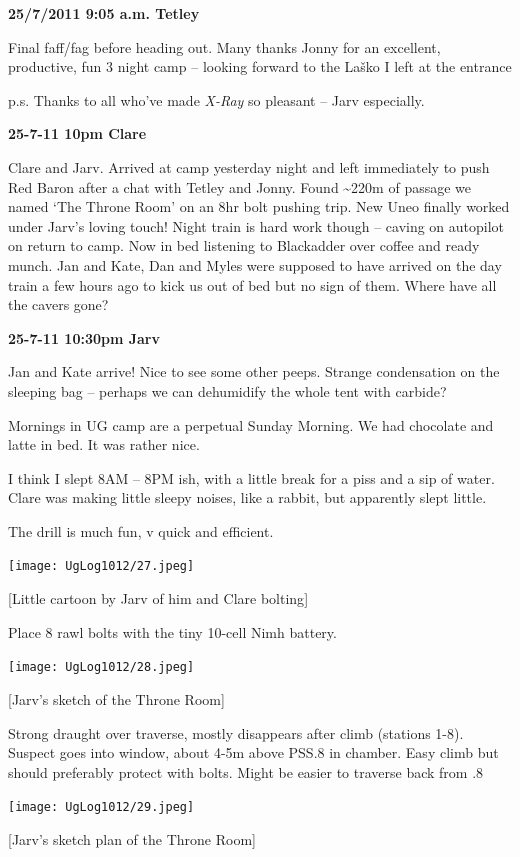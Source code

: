 \textbf{25/7/2011 9:05 a.m. Tetley}

Final faff/fag before heading out. Many thanks Jonny for an excellent,
productive, fun 3 night camp -- looking forward to the Laško I left at
the entrance

p.s. Thanks to all who've made \emph{X-Ray} so pleasant -- Jarv
especially.

\textbf{25-7-11 10pm Clare}

Clare and Jarv. Arrived at camp yesterday night and left immediately to
push Red Baron after a chat with Tetley and Jonny. Found
\textasciitilde{}220m of passage we named `The Throne Room' on an 8hr
bolt pushing trip. New Uneo finally worked under Jarv's loving touch!
Night train is hard work though -- caving on autopilot on return to
camp. Now in bed listening to Blackadder over coffee and ready munch.
Jan and Kate, Dan and Myles were supposed to have arrived on the day
train a few hours ago to kick us out of bed but no sign of them. Where
have all the cavers gone?

\textbf{25-7-11 10:30pm Jarv}

Jan and Kate arrive! Nice to see some other peeps. Strange condensation
on the sleeping bag -- perhaps we can dehumidify the whole tent with
carbide?

Mornings in UG camp are a perpetual Sunday Morning. We had chocolate and
latte in bed. It was rather nice.

I think I slept 8AM -- 8PM ish, with a little break for a piss and a sip
of water. Clare was making little sleepy noises, like a rabbit, but
apparently slept little.

The drill is much fun, v quick and efficient.

\texttt{[image: UgLog1012/27.jpeg]}

{[}Little cartoon by Jarv of him and Clare bolting{]}

Place 8 rawl bolts with the tiny 10-cell Nimh battery.

\texttt{[image: UgLog1012/28.jpeg]}

{[}Jarv's sketch of the Throne Room{]}

Strong draught over traverse, mostly disappears after climb (stations
1-8). Suspect goes into window, about 4-5m above PSS.8 in chamber. Easy
climb but should preferably protect with bolts. Might be easier to
traverse back from .8

\texttt{[image: UgLog1012/29.jpeg]}

{[}Jarv's sketch plan of the Throne Room{]}

